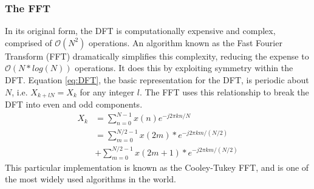 \documentclass[conference]{IEEEtran}
\begin{document}
\subsubsection{The FFT}\label{sec:TheFFT}
In its original form, the DFT is computationally expensive and complex, comprised of $\mathcal{O}(N^{2})$ operations. An algorithm known as the Fast Fourier Transform (FFT) dramatically simplifies this complexity, reducing the expense to $\mathcal{O}(N*log(N))$ operations. It does this by exploiting symmetry within the DFT. Equation \eqref{eq:DFT}, the basic representation for the DFT, is periodic about $N$, i.e. $X_{k+lN}=X_{k}$ for any integer $l$. The FFT uses this relationship to break the DFT into even and odd components.
\begin{equation}\label{eq:FFT}
  \begin{split}
 X_{k} & =\sum_{n=0}^{N-1}{x(n)e^{-j2\pi kn/N}}\\
  & =\sum_{m=0}^{N/2-1}{x(2m)*e^{-j2\pi km/(N/2)}}\\ & + \sum_{m=0}^{N/2-1}{x(2m+1)*e^{-j2\pi km/(N/2)}}
  \end{split}
\end{equation}
This particular implementation is known as the Cooley-Tukey FFT, and is one of the most widely used algorithms in the world. 
\end{document}
